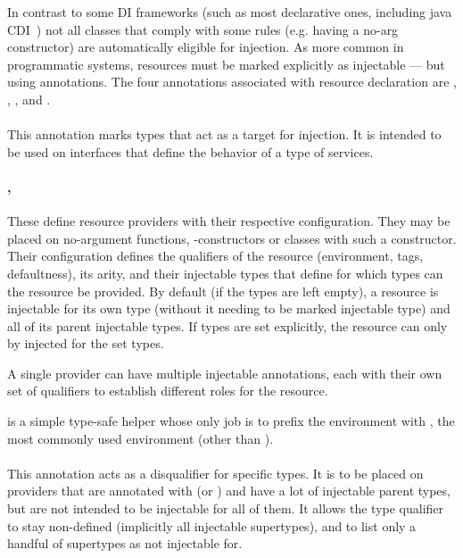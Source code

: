 	In contrast to some DI frameworks (such as most declarative ones, including java CDI~\cite{CdiInjectable}) not all classes that comply with some rules (e.g. having a no-arg constructor) are automatically eligible for injection. As more common in programmatic systems, resources must be marked explicitly as injectable --- but using annotations.
	The four annotations associated with resource declaration are , , , and .

		\paragraph{} This annotation marks types that act as a target for injection. It is intended to be used on interfaces that define the behavior of a type of services.
		
		\paragraph{, } These define resource providers with their respective configuration. They may be placed on no-argument functions, -constructors or classes with such a constructor. Their configuration defines the qualifiers of the resource (environment, tags, defaultness), its arity, and their injectable types that define for which types can the resource be provided. By default (if the types are left empty), a resource is injectable for its own type (without it needing to be marked injectable type) and all of its parent injectable types. If types are set explicitly, the resource can only by injected for the set types.
		
		A single provider can have multiple injectable annotations, each with their own set of qualifiers to establish different roles for the resource.
		
		 is a simple type-safe helper whose only job is to prefix the environment with , the most commonly used environment (other than ).

		\paragraph{} This annotation	acts as a disqualifier for specific types. It is to be placed on providers that are annotated with  (or ) and have a lot of injectable parent types, but are not intended to be injectable for all of them. It allows the type qualifier to stay non-defined (implicitly all injectable supertypes), and to list only a handful of supertypes as not injectable for.

